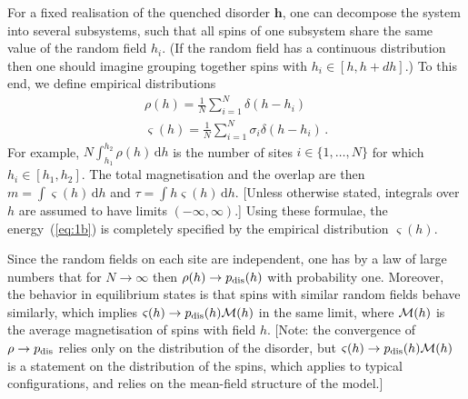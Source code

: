 \documentclass{iopart}
\newcommand{\eqref}[1]{(\ref{#1})}
\begin{document}
For a fixed realisation of the quenched disorder $\bm{h}$, one can decompose the system into several subsystems, such that all spins of one subsystem share the same value of the random field $h_{i}$.
(If the random field has a continuous distribution then one should imagine grouping together spins with $h_i \in [h,h+dh]$.)
To this end, we define empirical distributions
\begin{eqnarray}
  \label{eq:3}
    \rho(h) = \frac{1}{N}\sum_{i=1}^{N} \delta(h-h_{i}) 
    \nonumber \\
     \varsigma(h)
    = \frac{1}{N} \sum_{i=1}^{N} \sigma_{i} \delta(h - h_{i}) \, .
\end{eqnarray}
For example, $N \int_{h_{1}}^{h_{2}}\! \rho(h)\, \mathrm{d}h$ is the number of sites $i\in \{1, \dots{}, N\}$ for which $h_{i} \in [h_{1}, h_{2}]$.
The total magnetisation and the overlap are then $ m = \int \varsigma(h)\, \mathrm{d}h $
and $\tau = \int h\varsigma(h)\, \mathrm{d}h $.
[Unless otherwise stated, integrals over $h$ are assumed to have limits $(-\infty,\infty)$.]
Using these formulae, the energy~\eqref{eq:1b} is completely specified by the empirical distribution $\varsigma(h)$. 

Since the random fields on each site are independent, one has by a law of large numbers that for $N\to\infty$ then $\rho(h) \to p_{\rm dis}(h)$ with probability one.  Moreover, the behavior in equilibrium states is that spins with similar random fields behave similarly, which implies $\varsigma(h) \to p_{\rm dis}(h) {\cal M}(h)$ in the same limit, where ${\cal M}(h)$ is the average magnetisation of spins with field $h$.  [Note: the convergence of $\rho\to p_{\rm dis}$ relies only on the distribution of the disorder, but $\varsigma(h) \to p_{\rm dis}(h) {\cal M}(h)$ is a statement on the distribution of the spins, which applies to typical configurations, and relies on the mean-field structure of the model.]
\end{document}
